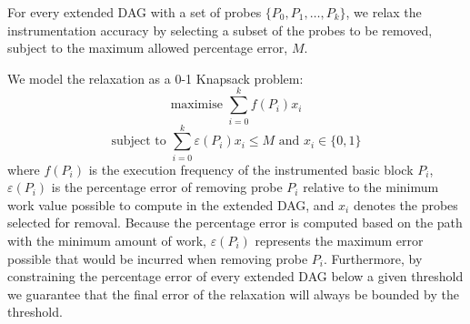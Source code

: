 For every extended DAG with a set of probes $\{P_0, P_1, \ldots, P_k\}$, we relax the instrumentation accuracy by selecting a subset of the probes to be removed, subject to the maximum allowed percentage error, $M$.

We model the relaxation as a 0-1 Knapsack problem:
\[
\textrm{maximise } \sum_{i=0}^{k} f(P_i)x_i
\]
\[
\textrm{subject to } \sum_{i=0}^{k} \varepsilon(P_i)x_i \leq M \textrm{ and } x_i\in\{0,1\}
\]
where $f(P_i)$ is the execution frequency of the instrumented basic block $P_i$, $\varepsilon(P_i)$ is the percentage error of removing probe $P_i$ relative to the minimum work value possible to compute in the extended DAG, and $x_i$ denotes the probes selected for removal.
Because the percentage error is computed based on the path with the minimum amount of work, $\varepsilon(P_i)$ represents the maximum error possible that would be incurred when removing probe $P_i$.
Furthermore, by constraining the percentage error of every extended DAG below a given threshold we guarantee that the final error of the relaxation will always be bounded by the threshold.


